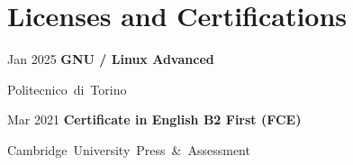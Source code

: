 \section{Licenses and Certifications}

\begin{samepage}
    \begin{twocolentry}{
        Jan 2025 %
    }
        \textbf{GNU / Linux Advanced}

        \vspace{0.10 cm}

        \mbox{Politecnico di Torino}
        \vspace{0.10 cm}

    \end{twocolentry}
\end{samepage}

\vspace{0.2 cm} %

\begin{samepage}
    \begin{twocolentry}{
        Mar 2021 %
    }
        \textbf{Certificate in English B2 First (FCE)}

        \vspace{0.10 cm}

        \mbox{Cambridge University Press \& Assessment}
        \vspace{0.10 cm}

    \end{twocolentry}
\end{samepage}
